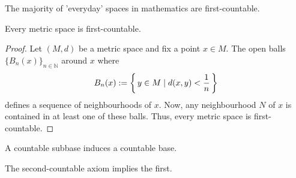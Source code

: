 \begin{rembox}
    \begin{remark}
        The majority of 'everyday' spaces in mathematics are first-countable.
    \end{remark}
\end{rembox}

\begin{exmbox}
    \begin{example}
        Every metric space is first-countable.
    \end{example}
\end{exmbox}

\begin{proof}
    Let \((M, d)\) be a metric space and fix a point \(x \in M\). The open balls \(\{B_n(x)\}_{n \in \mathbb{N}}\) around \(x\) where
    \begin{align*}
        B_n(x) := \left\{\, y \in M \mid d(x, y) < \frac{1}{n} \,\right\}
    \end{align*}
    defines a sequence of neighbourhoods of \(x\). Now, any neighbourhood \(N\) of \(x\) is contained in at least one of these balls. Thus, every metric space is first-countable.
\end{proof}

\begin{rembox}
    \begin{remark}
        A countable subbase induces a countable base.
    \end{remark}
\end{rembox}

\begin{thmbox}
    \begin{lemma}
        The second-countable axiom implies the first.
    \end{lemma}
\end{thmbox}

